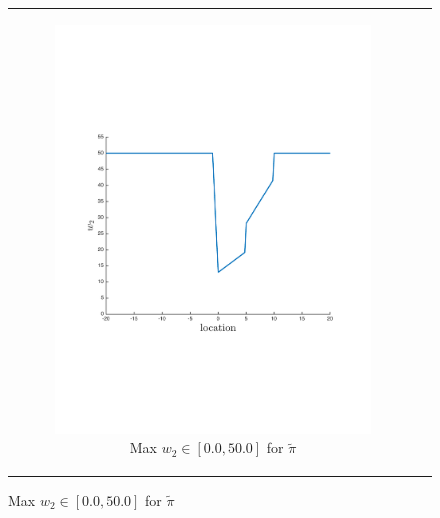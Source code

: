 {\centering
    \begin{figure}[ht]
        \begin{tabular}{cc}
            \begin{subfigure}{0.24\textwidth}\centering\includegraphics[width=\textwidth]{images/robot_opt_new}\caption{Max {\footnotesize $w_2 \in \left[0.0, 50.0 \right]$} for $ \tilde{\pi} $}\label{fig:navigation_opt}\end{subfigure}&            

\end{tabular}
\end{figure}}
